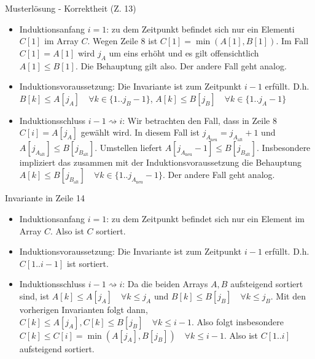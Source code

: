 \documentclass[18pt]{beamer}
\begin{document}
\begin{frame}{Musterlösung - Korrektheit (Z. 13)}
\begin{itemize}
 \item Induktionsanfang $i=1$: zu dem Zeitpunkt befindet sich nur ein Elementi $C[1]$ im Array $C$. Wegen Zeile 8 ist $C[1] = \min(A[1],B[1])$. Im Fall $C[1] = A[1]$ wird $j_A$ um eins erhöht und es gilt offensichtlich $A[1] \leq B[1]$. Die Behauptung gilt also. Der andere Fall geht analog.
 \item Induktionsvoraussetzung: Die Invariante ist zum Zeitpunkt $i-1$ erfüllt. D.h. $B[k] \leq A[j_A] \quad  \forall k \in \{1..j_B-1\}$, $A[k] \leq B[j_B]\quad  \forall k \in \{1..j_A-1\}$
 \item Induktionsschluss $i-1 \rightsquigarrow i$: Wir betrachten den Fall, dass in Zeile 8 $C[i] =  A[j_A]$ gewählt wird. In diesem Fall ist $j_{A_{\text{neu}}} = j_{A_{\text{alt}}} +1 $ und $A[j_{A_{\text{alt}}}] \leq B[j_{B_{\text{alt}}}]$. Umstellen liefert  $A[j_{A_{\text{neu}}}-1] \leq B[j_{B_{\text{alt}}}]$.
	Insbesondere impliziert das zusammen mit der Induktionsvoraussetzung die Behauptung $A[k] \leq B[j_{B_\text{alt}}]\quad  \forall k \in \{1..j_{A_{\text{neu}}}-1\}$. Der andere Fall geht analog.  
\end{itemize}

	
        
	
\end{frame}
\begin{frame}{Invariante in  Zeile 14}
\begin{itemize}
 \item Induktionsanfang $i=1$: zu dem Zeitpunkt befindet sich nur ein Element im Array $C$. Also ist $C$ sortiert. \\
 \item Induktionsvoraussetzung: Die Invariante ist zum Zeitpunkt $i-1$ erfüllt. D.h. $C[1..i-1]$ ist sortiert.\\
 \item 	Induktionsschluss $i-1 \rightsquigarrow i$: Da die beiden Arrays $A, B$ aufsteigend sortiert sind, ist $A[k] \leq A[j_A] \quad \forall k \leq  j_A$ und $B[k] \leq B[j_B] \quad \forall k \leq j_B$. Mit den vorherigen Invarianten folgt dann, $C[k] \leq A[j_A], C[k] \leq B[j_B] \quad 	\forall k \leq i-1$. Also folgt insbesondere $C[k] \leq C[i] = \min(A[j_A],B[j_B]) \quad \forall k \leq i-1 $. Also ist $C[1..i]$ aufsteigend sortiert.

\end{itemize}
\end{frame}
\end{document}
